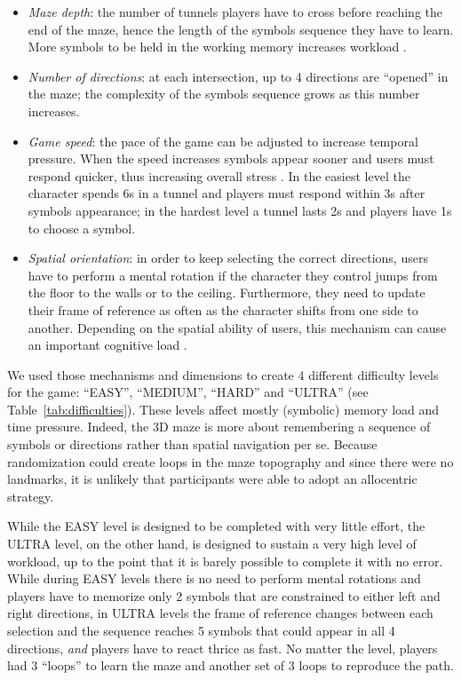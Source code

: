 \documentclass[]{sigchi}
\begin{document}
\begin{itemize}
\itemsep1pt\parskip0pt
\item
  \emph{Maze depth}: the number of tunnels players have to cross before
  reaching the end of the maze, hence the length of the symbols sequence
  they have to learn. More symbols to be held in the working memory
  increases workload \citep{Grimes2008, Sternberg1966}.
\item
  \emph{Number of directions}: at each intersection, up to 4 directions
  are ``opened'' in the maze; the complexity of the symbols sequence
  grows as this number increases.
\item
  \emph{Game speed}: the pace of the game can be adjusted to increase
  temporal pressure. When the speed increases symbols appear sooner and
  users must respond quicker, thus increasing overall stress
  \citep{Hart1988, Maule1997}. In the easiest level the character spends
  6s in a tunnel and players must respond within 3s after symbols
  appearance; in the hardest level a tunnel lasts 2s and players have 1s
  to choose a symbol.
\item
  \emph{Spatial orientation}: in order to keep selecting the correct
  directions, users have to perform a mental rotation if the character
  they control jumps from the floor to the walls or to the ceiling.
  Furthermore, they need to update their frame of reference as often as
  the character shifts from one side to another. Depending on the
  spatial ability of users, this mechanism can cause an important
  cognitive load \citep{Poor2013}.
\end{itemize}

We used those mechanisms and dimensions to create 4 different difficulty
levels for the game: ``EASY'', ``MEDIUM'', ``HARD'' and ``ULTRA'' (see
Table~\ref{tab:difficulties}). These levels affect mostly (symbolic)
memory load and time pressure. Indeed, the 3D maze is more about
remembering a sequence of symbols or directions rather than spatial
navigation per se. Because randomization could create loops in the maze
topography and since there were no landmarks, it is unlikely that
participants were able to adopt an allocentric strategy.

While the EASY level is designed to be completed with very little
effort, the ULTRA level, on the other hand, is designed to sustain a
very high level of workload, up to the point that it is barely possible
to complete it with no error. While during EASY levels there is no need
to perform mental rotations and players have to memorize only 2 symbols
that are constrained to either left and right directions, in ULTRA
levels the frame of reference changes between each selection and the
sequence reaches 5 symbols that could appear in all 4 directions,
\emph{and} players have to react thrice as fast. No matter the level,
players had 3 ``loops'' to learn the maze and another set of 3 loops to
reproduce the path.
\end{document}

